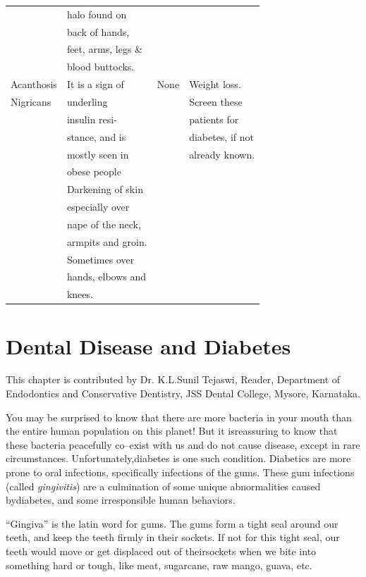 \begin{longtable}{|l|l|l|l|}
 & halo found on &  & \\
 & back of hands, &  & \\
 & feet, arms, legs \& &  & \\
 & blood buttocks. &  & \\
\hline
Acanthosis & It is a sign of & None & Weight loss.\\
Nigricans & underling &  & Screen these\\
 & insulin resi- &  & patients for\\
 & stance, and is &  & diabetes, if not\\
 & mostly seen in &  & already known.\\
 & obese people &  & \\
 & Darkening of skin &  & \\
 & especially over &  & \\
 & nape of the neck, &  & \\
 & armpits and groin. &  & \\
 & Sometimes over &  & \\
 & hands, elbows and &  & \\
 & knees. &  & \\
\hline
\end{longtable}


\newpage
 
\setcounter{chapter}{17}
\renewcommand{\thechapter}{\arabic{chapter}B}
\chapter{Dental Disease and Diabetes}\label{chap18B}

This chapter is contributed by Dr. K.L.Sunil Tejaswi, Reader, Department of Endodontics and Conservative Dentistry, JSS Dental College, Mysore, Karnataka.

You may be surprised to know that there are more bacteria in your mouth than the entire human population on this planet! But it is\break reassuring to know that these bacteria peacefully co–exist with us and do not cause disease, except in rare circumstances. Unfortunately,\break diabetes is one such condition. Diabetics are more prone to oral infe\-ctions, specifically infections of the gums. These gum infections (called \textit{gingivitis}) are a culmination of some unique abnormalities caused by\break diabetes, and some irresponsible human behaviors.

“Gingiva” is the latin word for gums. The gums form a tight seal around our teeth, and keep the teeth firmly in their sockets. If not for this tight seal, our teeth would move or get displaced out of their\break sockets when we bite into something hard or tough, like meat, sugarcane, raw mango, guava, etc.

